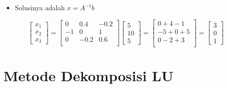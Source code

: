 \documentclass[pdflatex,compress,mathserif]{beamer}
\begin{document}
\begin{frame}
	\begin{itemize}
		\item Solusinya adalah $ x = A^{-1}b $
	\end{itemize}
	\[
		\begin{bmatrix}
		x_1\\ x_2 \\ x_3
		\end{bmatrix}
		=
		\begin{bmatrix}
			0 & 0.4 & -0.2 \\
			-1 & 0 & 1 \\
			0 & -0.2 & 0.6 \\
		\end{bmatrix}
		\begin{bmatrix}
		5 \\ 10 \\ 5
		\end{bmatrix}
		=
		\begin{bmatrix}
		0 + 4 -1 \\
		-5 + 0 + 5 \\
		0 - 2 + 3 \\
		\end{bmatrix}
		=
		\begin{bmatrix}
		3 \\ 0 \\ 1
		\end{bmatrix}
	\]
\end{frame}

\section{Metode Dekomposisi LU}
\end{document}
